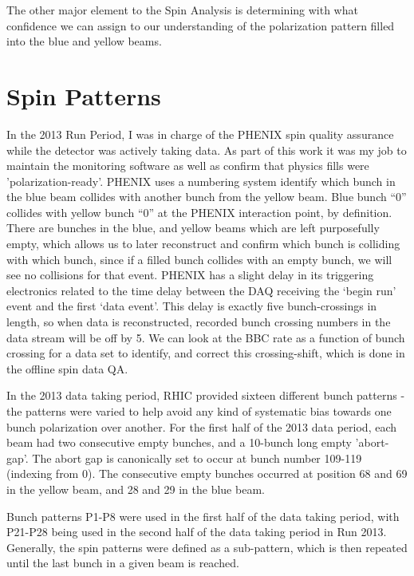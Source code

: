 The other major element to the Spin Analysis is determining with what confidence
we can assign to our understanding of the polarization pattern filled into the
blue and yellow beams.

\section{Spin Patterns}

In the 2013 Run Period, I was in charge of the PHENIX spin quality assurance
while the detector was actively taking data. As part of this work it was my job
to maintain the monitoring software as well as confirm that physics fills were
'polarization-ready'. PHENIX uses a numbering system identify which bunch in the
blue beam collides with another bunch from the yellow beam. Blue bunch ``0''
collides with yellow bunch ``0'' at the PHENIX interaction point, by definition.
There are bunches in the blue, and yellow beams which are left purposefully
empty, which allows us to later reconstruct and confirm which bunch is colliding
with which bunch, since if a filled bunch collides with an empty bunch, we will
see no collisions for that event. PHENIX has a slight delay in its triggering
electronics related to the time delay between the DAQ receiving the `begin run'
event and the first `data event'. This delay is exactly five bunch-crossings in
length, so when data is reconstructed, recorded bunch crossing numbers in the
data stream will be off by 5. We can look at the BBC rate as a function of bunch
crossing for a data set to identify, and correct this crossing-shift, which is
done in the offline spin data QA.

In the 2013 data taking period, RHIC provided sixteen different bunch patterns -
the patterns were varied to help avoid any kind of systematic bias towards one
bunch polarization over another. For the first half of the 2013 data period,
each beam had two consecutive empty bunches, and a 10-bunch long empty
'abort-gap'. The abort gap is canonically set to occur at bunch number 109-119
(indexing from 0). The consecutive empty bunches occurred at position 68 and 69
in the yellow beam, and 28 and 29 in the blue beam.

Bunch patterns P1-P8 were used in the first half of the data taking period, with
P21-P28 being used in the second half of the data taking period in Run 2013.
Generally, the spin patterns were defined as a sub-pattern, which is then
repeated until the last bunch in a given beam is reached.

